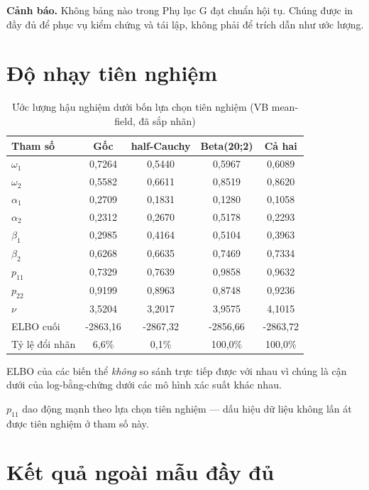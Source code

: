 \documentclass[11pt,a4paper]{article}
\begin{document}
\textbf{Cảnh báo.} Không bảng nào trong Phụ lục G đạt chuẩn hội tụ. Chúng được in
đầy đủ để phục vụ kiểm chứng và tái lập, không phải để trích dẫn như ước lượng.

\section{Độ nhạy tiên nghiệm}

\begin{table}[H]\centering\footnotesize
\caption{Ước lượng hậu nghiệm dưới bốn lựa chọn tiên nghiệm (VB mean-field, đã sắp nhãn)}
\begin{tabularx}{\textwidth}{l C C C C}
\toprule
\textbf{Tham số} & \textbf{Gốc} & \textbf{half-Cauchy} & \textbf{Beta(20;2)} & \textbf{Cả hai} \\
\midrule
$\omega_1$ & 0{,}7264 & 0{,}5440 & 0{,}5967 & 0{,}6089 \\
$\omega_2$ & 0{,}5582 & 0{,}6611 & 0{,}8519 & 0{,}8620 \\
$\alpha_1$ & 0{,}2709 & 0{,}1831 & 0{,}1280 & 0{,}1058 \\
$\alpha_2$ & 0{,}2312 & 0{,}2670 & 0{,}5178 & 0{,}2293 \\
$\beta_1$ & 0{,}2985 & 0{,}4164 & 0{,}5104 & 0{,}3963 \\
$\beta_2$ & 0{,}6268 & 0{,}6635 & 0{,}7469 & 0{,}7334 \\
$p_{11}$ & 0{,}7329 & 0{,}7639 & 0{,}9858 & 0{,}9632 \\
$p_{22}$ & 0{,}9199 & 0{,}8963 & 0{,}8748 & 0{,}9236 \\
$\nu$ & 3{,}5204 & 3{,}2017 & 3{,}9575 & 4{,}1015 \\
\midrule
ELBO cuối & -2863{,}16 & -2867{,}32 & -2856{,}66 & -2863{,}72 \\
Tỷ lệ đổi nhãn & 6{,}6\% & 0{,}1\% & 100{,}0\% & 100{,}0\% \\
\bottomrule
\end{tabularx}
\begin{tablenotes}\footnotesize
\item ELBO của các biến thể \emph{không} so sánh trực tiếp được với nhau vì chúng là cận dưới của log-bằng-chứng dưới các mô hình xác suất khác nhau.
\item $p_{11}$ dao động mạnh theo lựa chọn tiên nghiệm --- dấu hiệu dữ liệu không lấn át được tiên nghiệm ở tham số này.
\end{tablenotes}
\end{table}

\section{Kết quả ngoài mẫu đầy đủ}
\end{document}
